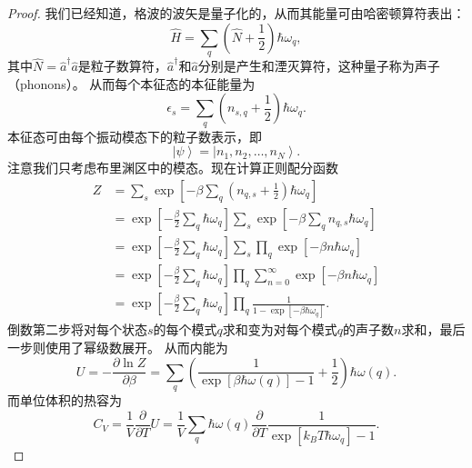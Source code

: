\begin{proof}
    我们已经知道，格波的波矢是量子化的，从而其能量可由哈密顿算符表出：
    \begin{equation}
        \hat H = \sum_q (\hat N + \frac{1}{2}) \hbar \omega_q,
    \end{equation}
    其中$\hat N = \hat a^\dagger \hat a$是粒子数算符，$\hat a^\dagger$和$\hat a$分别是产生和湮灭算符，这种量子称为声子（phonons）。
    从而每个本征态的本征能量为
    \begin{equation}
        \epsilon_s = \sum_q (n_{s,q} + \frac{1}{2}) \hbar \omega_q.
    \end{equation}
    本征态可由每个振动模态下的粒子数表示，即
    \begin{equation}
        \left| \psi \right> = \left| n_1, n_2, \dots, n_N \right>.
    \end{equation}
    注意我们只考虑布里渊区中的模态。现在计算正则配分函数
    \begin{equation}
        \begin{aligned}
            Z &= \sum_s \exp \left[ -\beta \sum_q (n_{q,s} + \frac{1}{2}) \hbar \omega_q \right] \\
            &= \exp \left[-\frac{\beta}{2} \sum_q \hbar \omega_q\right] \sum_s \exp\left[-\beta \sum_q n_{q,s} \hbar \omega_q\right] \\
            &= \exp \left[-\frac{\beta}{2} \sum_q \hbar \omega_q\right] \sum_s \prod_q \exp \left[ -\beta n \hbar \omega_q \right] \\
            &= \exp \left[-\frac{\beta}{2} \sum_q \hbar \omega_q\right] \prod_q \sum_{n = 0}^{\infty} \exp \left[ -\beta n \hbar \omega_q \right] \\
            & = \exp \left[-\frac{\beta}{2} \sum_q \hbar \omega_q\right] \prod_q \frac{1}{1-\exp[-\beta\hbar\omega_q]}.
        \end{aligned}
    \end{equation}
    倒数第二步将对每个状态$s$的每个模式$q$求和变为对每个模式$q$的声子数$n$求和，最后一步则使用了幂级数展开。
    从而内能为
    \begin{equation}
        U = - \frac{\partial \ln Z}{\partial \beta} = \sum_q \left(\frac{1}{\exp[\beta\hbar\omega(q)]-1} + \frac{1}{2} \right) \hbar \omega(q).
    \end{equation}
    而单位体积的热容为
    \begin{equation}
        C_V = \frac{1}{V} \frac{\partial}{\partial T} U = \frac{1}{V} \sum_q \hbar \omega(q) \frac{\partial}{\partial T} \frac{1}{\exp[k_B T \hbar \omega_q ] - 1}.
    \end{equation}
\end{proof}

